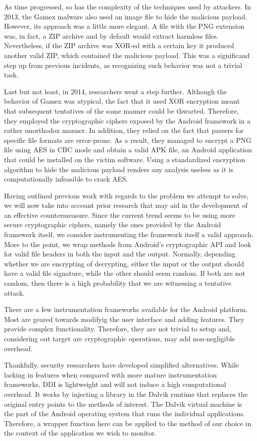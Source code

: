 As time progressed, so has the complexity of the techniques used by attackers.
In 2013, the Gamex malware also used an image file to hide the malicious
payload\cite{hiding-apk}. However, its approach was a little more elegant. A
file with the PNG extension was, in fact, a ZIP archive and by default would
extract harmless files. Nevertheless, if the ZIP archive was XOR-ed with a
certain key it produced another valid ZIP, which contained the malicious
payload. This was a significand step up from previous incidents, as
recognizing such behavior was not a trivial task.

Last but not least, in 2014, researchers went a step further\cite{hiding-apk}.
Although the behavior of Gamex was atypical, the fact that it used XOR
encryption meant that subsequent tentatives of the same manner could be
thwarted. Therefore, they employed the cryptographic ciphers exposed by the
Android framework in a rather unorthodox manner. In addition, they relied on
the fact that parsers for specific file formats are error-prone. As a result,
they managed to encrypt a PNG file using AES in CBC mode and obtain a valid
APK file, an Android application that could be installed on the victim
software. Using a standardized encryption algorithm to hide the malicious
payload renders any analysis useless as it is computationally infeasible to
crack AES.

Having outlined previous work with regards to the problem we attempt to solve,
we will now take into account prior research that may aid in the development
of an effective countermeasure. Since the current trend seems to be using more
secure cryptographic ciphers, namely the ones provided by the Android
framework itself, we consider instrumenting the framework itself a valid
approach. More to the point, we wrap methods from Android's cryptographic API
and look for valid file headers in both the input and the output. Normally,
depending whether we are encrypting of decrypting, either the input or the
output should have a valid file signature, while the other should seem random.
If both are not random, then there is a high probability that we are
witnessing a tentative attack.

There are a few instrumentation frameworks available for the Android platform.
Most are geared towards modifyig the user interface and adding features. They
provide complex functionality. Therefore, they are not trivial to setup and,
considering out target are cryptographic operations, may add non-negligible
overhead.

Thankfully, security researchers have developed simplified
alternatives. While lacking in features when compared with more
mature instrumentation frameworks, DDI\cite{ddi} is lightweight and will not
induce a high computational overhead. It works by injecting a library in the
Dalvik runtime that replaces the original entry points to the methods of
interest. The Dalvik virtual machine is the part of the Android operating
system that runs the individual applications. Therefore, a wrapper function
here can be applied to the method of our choice in the context of the
application we wish to monitor.
